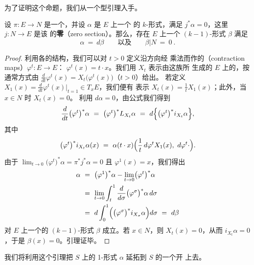 为了证明这个命题，我们从一个\trPoincare{}型引理入手。

\begin{lemma}\label{lem:poincare-type-lemma}
设 $\pi:E\to N$ 是一个\trVectorBundle，并设 $\alpha$ 是 $E$ 上一个\trClosed{}%
的 $k$-形式，满足 $j^{*}\alpha=0$，这里\trInclusionMapping{} $j:N\to E$ 是该%
\trBundle{}的\textbf{零\trSection}（zero section）。那么，存在 $E$ 上一个%
$(k-1)$-形式 $\beta$ 满足
\[
\alpha\ =\ d\beta\qquad\text{以及}\qquad\beta|N\ =\ 0\ .
\]
\end{lemma}
\begin{proof}
利用各\trFiber{}的\trLinear{}结构，我们可以对 $t>0$ 定义沿\trFiber{}方向经%
乘法而作的\textbf{\trContractionMap}（contraction maps）$\varphi^{t}:E\to E$：%
$\varphi^{t}(x)=t\cdot x$。我们用 $X_{t}$ 表示由这族\trDiffeomorphism{}所%
生成的 $E$ 上的\trTimeDependent\trVectorField，按通常方式由%
$\frac{d}{dt}\varphi^{t}(x)=X_{t}\bigl(\varphi^{t}(x)\bigr)$（$t>0$）给出。%
若定义 $X_{1}(x)=\frac{d}{dt}\varphi^{t}(x)\big|_{t=1}\in T_{x}E$，我们便有%
表示 $X_{t}(x)=\frac{1}{t}X_{1}(x)$；此外，当 $x\in N$ 时 $X_{t}(x)=0$。%
利用 $d\alpha=0$，由\trCartan{}公式我们得到
\[
\frac{d}{dt}\bigl(\varphi^{t}\bigr)^{*}\alpha\ =\ \bigl(\varphi^{t}\bigr)^{*}%
L_{X_{t}}\alpha\ =\ d\Bigl\{\bigl(\varphi^{t}\bigr)^{*}i_{X_{t}}\alpha\Bigr\},
\]
其中
\[
\bigl(\varphi^{t}\bigr)^{*}i_{X_{t}}\alpha(x)\ =\ \alpha(t\cdot x)%
\Bigl(\frac{1}{t}\,d\varphi^{t}X_{1}(x),\ d\varphi^{t}\cdot\Bigr).
\]
由于 $\lim_{t\to0}\bigl(\varphi^{t}\bigr)^{*}\alpha=\pi^{*}j^{*}\alpha=0$ 且%
$\varphi^{1}(x)=x$，我们得出
\begin{align*}
\alpha\ &=\ \bigl(\varphi^{1}\bigr)^{*}\alpha-\lim_{t\to0}\bigl(\varphi^{t}\bigr)^{*}\alpha\\
&=\ \lim_{t\to0}\int_{t}^{1}\frac{d}{d\sigma}\bigl(\varphi^{\sigma}\bigr)^{*}\alpha\,d\sigma\\
&=\ d\int_{0}^{1}\Bigl(\bigl(\varphi^{\sigma}\bigr)^{*}i_{X_{\sigma}}\alpha\Bigr)d\sigma\ =\ d\beta
\end{align*}
对 $E$ 上一个\trSmooth{}的 $(k-1)$-形式 $\beta$ 成立。若 $x\in N$，则%
$X_{t}(x)=0$，从而 $i_{X_{t}}\alpha=0$，于是 $\beta(x)=0$。引理证毕。
\end{proof}

我们将利用这个引理把 $S$ 上的 1-形式 $\alpha$ 延拓到 $S$ 的一个开%
\trNeighborhood{}上去。

